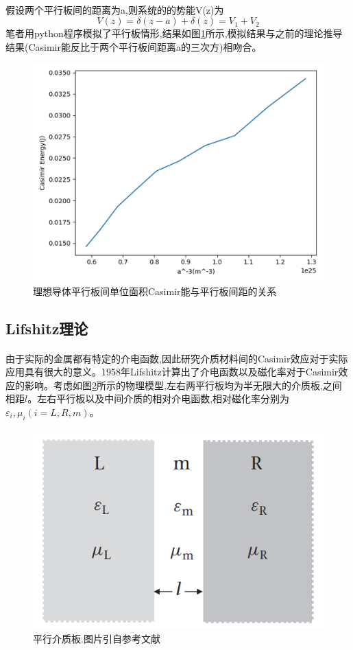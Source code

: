 \paragraph*{}
假设两个平行板间的距离为a,则系统的的势能V(z)为
$$
V(z)=\delta(z-a)+\delta(z)=V_{1}+V_{2}
$$
笔者用python程序模拟了平行板情形,结果如图\ref{fig:6}所示,模拟结果与之前的理论推导结果(Casimir能反比于两个平行板间距离a的三次方)相吻合。
\begin{figure}[h]
	\centering
	\includegraphics[width=0.7\linewidth]{figures/世界线3}
	\caption{理想导体平行板间单位面积Casimir能与平行板间距的关系}
	\label{fig:6}
\end{figure}



\subsection{Lifshitz理论}
\paragraph*{}
由于实际的金属都有特定的介电函数,因此研究介质材料间的Casimir效应对于实际应用具有很大的意义。1958年Lifshitz计算出了介电函数以及磁化率对于Casimir效应的影响\cite{Lifshitz_1958}。考虑如图\ref{fig:3}所示的物理模型,左右两平行板均为半无限大的介质板,之间相距$l$。左右平行板以及中间介质的相对介电函数,相对磁化率分别为$\varepsilon _i,\mu _i(i=L,R,m)$。
\begin{figure}[h]
	\centering
	\includegraphics[width=0.7\linewidth]{figures/lifshitz1}
	\caption{平行介质板.图片引自参考文献\cite{Lifshitz_1958}}
	\label{fig:3}
\end{figure}
